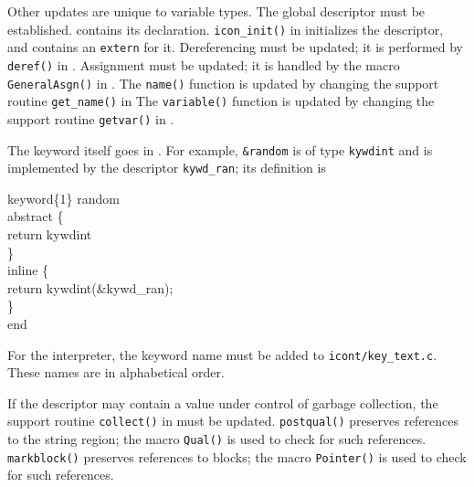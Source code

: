 Other updates are unique to variable types. The global descriptor must be
established.  contains its declaration.
\texttt{icon\_init()} in  initializes the descriptor,
and  contains an \texttt{extern} for it. Dereferencing
must be updated; it is performed by \texttt{deref()} in .
Assignment must be updated; it is handled by the macro \texttt{GeneralAsgn()}
in . The \texttt{name()} function is updated by
changing the support routine \texttt{get\_name()} in 
The \texttt{variable()} function is updated by changing the support
routine \texttt{getvar()} in .

The keyword itself goes in . For example,
\texttt{\&random} is of type \texttt{kywdint} and is implemented by the descriptor
\texttt{kywd\_ran}; its definition is
\begin{iconcode}
keyword\{1\} random\\
\>abstract \{\\
\>\>return kywdint\\
\>\}\\
\>inline \{\\
\>\>return kywdint(\&kywd\_ran);\\
\>\}\\
end
\end{iconcode}
\noindent
For the interpreter, the keyword name must be added to
\texttt{icont/key\_text.c}. These names are in alphabetical order.

If the descriptor may contain a value under control of garbage collection,
the support routine \texttt{collect()} in  must be
updated. \texttt{postqual()} preserves references to the string region;
the macro \texttt{Qual()} is used to check for such references.
\texttt{markblock()} preserves references to blocks; the macro \texttt{Pointer()}
is used to check for such references.

\clearpage
\newpage
